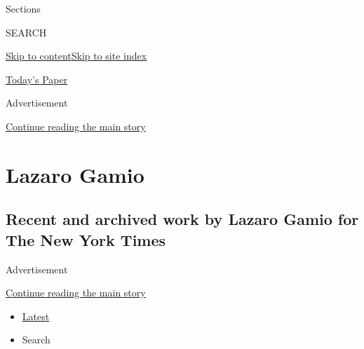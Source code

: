 Sections

SEARCH

\protect\hyperlink{site-content}{Skip to
content}\protect\hyperlink{site-index}{Skip to site index}

\href{https://myaccount.nytimes3xbfgragh.onion/auth/login?response_type=cookie\&client_id=vi}{}

\href{https://www.nytimes3xbfgragh.onion/section/todayspaper}{Today's
Paper}

Advertisement

\protect\hyperlink{after-top}{Continue reading the main story}

\hypertarget{lazaro-gamio}{%
\section{Lazaro Gamio}\label{lazaro-gamio}}

\hypertarget{recent-and-archived-work-by-lazaro-gamio-for-the-new-york-times}{%
\subsection{Recent and archived work by Lazaro Gamio for The New York
Times}\label{recent-and-archived-work-by-lazaro-gamio-for-the-new-york-times}}

Advertisement

\protect\hyperlink{after-mid1}{Continue reading the main story}

\begin{itemize}
\tightlist
\item
  \protect\hyperlink{stream-panel}{Latest}
\item
  Search
\end{itemize}

